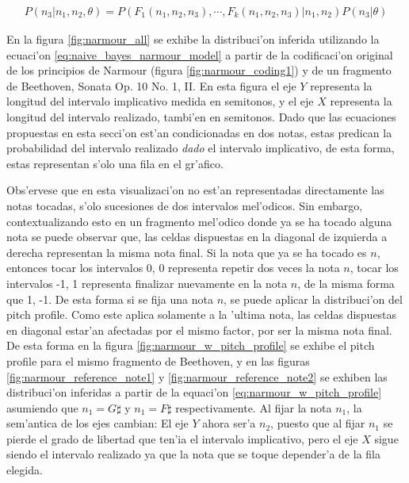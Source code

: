 \begin{align}
\label{eq:narmour_w_pitch_profile}
P(n_3 | n_1, n_2, \theta) = P(F_1(n_1, n_2, n_3), \cdots, F_k(n_1, n_2, n_3)|n_1, n_2) P(n_3|\theta)
\end{align}

En la figura \ref{fig:narmour_all} se exhibe la distribuci'on inferida utilizando la ecuaci'on \ref{eq:naive_bayes_narmour_model} a partir de la 
codificaci'on original de los principios de Narmour (figura \ref{fig:narmour_coding1}) y de un fragmento de Beethoven, Sonata Op. 10 No. 1, II. 
En esta figura el eje $Y$ representa la longitud del intervalo implicativo medida en semitonos, y el eje $X$ representa la longitud del intervalo 
realizado, tambi'en en semitonos. Dado que las ecuaciones propuestas en esta secci'on est'an condicionadas en dos notas, estas predican la probabilidad del intervalo 
realizado \emph{dado} el intervalo implicativo, de esta forma, estas representan s'olo una fila en el gr'afico.

Obs'ervese que en esta visualizaci'on no est'an representadas directamente las notas tocadas, s'olo sucesiones de dos intervalos mel'odicos. 
Sin embargo, contextualizando esto en un fragmento mel'odico donde ya se ha tocado alguna nota se puede observar que, las celdas dispuestas en la 
diagonal de izquierda a derecha representan la misma nota final. Si la nota que ya se ha tocado es $n$, entonces tocar los intervalos 0, 0 
representa repetir dos veces la nota $n$, tocar los intervalos -1, 1 representa finalizar nuevamente en la nota $n$, de la misma forma que 1, -1. 
De esta forma si se fija una nota $n$, se puede aplicar la distribuci'on del pitch profile. Como este aplica solamente a la 'ultima nota, las celdas
dispuestas en diagonal estar'an afectadas por el mismo factor, por ser la misma nota final. De esta forma en la figura \ref{fig:narmour_w_pitch_profile} 
se exhibe el pitch profile para el mismo fragmento de Beethoven, y en las figuras \ref{fig:narmour_reference_note1} y \ref{fig:narmour_reference_note2} se exhiben 
las distribuci'on inferidas a partir de la equaci'on \ref{eq:narmour_w_pitch_profile} asumiendo que $n_1=G\sharp$ y $n_1=F\sharp$ respectivamente. 
Al fijar la nota $n_1$, la sem'antica de los ejes cambian: El eje $Y$ ahora ser'a $n_2$, puesto que al fijar $n_1$ se pierde el grado de 
libertad que ten'ia el intervalo implicativo, pero el eje $X$ sigue siendo el intervalo realizado ya que la nota que se toque depender'a de la fila elegida.
\begin{imagen}
    \width{10cm}
\end{imagen}

